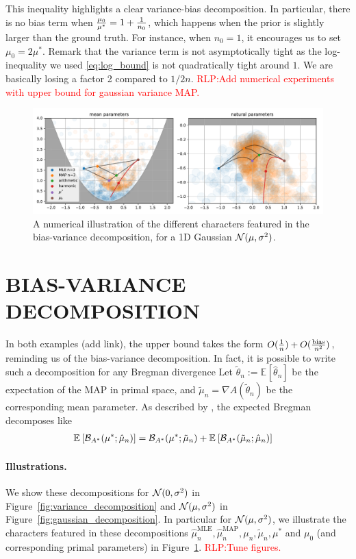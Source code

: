\documentclass[twoside]{article}
\let\oldsection\section
\renewcommand{\section}[1]{\oldsection{\uppercase{#1}}}
\newcommand{\RLP}[1]{\textcolor{red}{RLP:#1}}
\newcommand*{\expect}[2][]{\ensuremath{\mathbb{E}_{#1} \left[ #2 \right] }} %
\newcommand{\logpart}{A}
\newcommand{\bregmanconj}{\cB_{\logpart^*}}
\newcommand{\MAPm}{\hat \mu_n}
\begin{document}
This inequality highlights a clear variance-bias decomposition.
In particular, there is no bias term when $\frac{\mu_0}{\mu^*} =1 + \frac{1}{n_0} $, which happens when the prior is slightly larger than the ground truth.  For instance, when $n_0=1$, it encourages us to set $\mu_0 = 2 \mu^*$.
Remark that the variance term is not asymptotically tight as the log-inequality we used \eqref{eq:log_bound} is not quadratically tight around $1$. We are basically losing a factor 2 compared to $1/2n$.
\RLP{Add numerical experiments with upper bound for gaussian variance MAP.}


\begin{figure}[t]
	\centering
	\includegraphics[width=\textwidth]{figs/thales/numerical_schema_n=3.pdf}
	\caption{A numerical illustration of the different characters featured in the bias-variance decomposition, for a 1D Gaussian ${\mathcal N}(\mu, \sigma^2)$.}
	\label{fig:bias-variance-numerical}
\end{figure}

\section{Bias-Variance Decomposition}
In both examples (add link), the upper bound takes the form $O(\frac{1}{n}) + O(\frac{\text{bias}}{n^2})$, reminding us of the bias-variance decomposition. In fact, it is possible to write such a decomposition for any Bregman divergence
Let $\tilde \theta_n := \expect{\hat \theta_n}$ be the expectation of the MAP in primal space, and $\tilde \mu_n = \nabla \logpart(\tilde \theta_n )$ be the corresponding mean parameter.
As described by \citet[Theorem 0.1]{pfau2013generalized}, the  expected Bregman decomposes like
\begin{align}
	\expect{\bregmanconj(\mu^* ; \hat \mu_n)} 
	&= {\bregmanconj(\mu^* ; \tilde \mu_n)}
	+ {\expect{\bregmanconj(\tilde \mu_n ; \MAPm)}}
	\label{eq:primal_pivot}
\end{align}

\paragraph{Illustrations.}
We show these decompositions for ${\mathcal N}(0,\sigma^2)$ in Figure~\ref{fig:variance_decomposition} and  ${\mathcal N}(\mu, \sigma^2)$ in Figure~\ref{fig:gaussian_decomposition}.
In particular for ${\mathcal N}(\mu, \sigma^2)$, we illustrate the characters featured in these decompositions $\hat \mu_n^\text{MLE},\hat \mu_n^\text{MAP},\mu_n,\tilde \mu_n, \mu^*$ and $\mu_0$ (and corresponding primal parameters)  in Figure~\ref{fig:bias-variance-numerical}. \RLP{Tune figures.}
\end{document}
